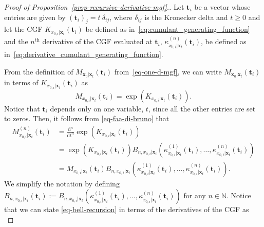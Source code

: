 \begin{proof}[Proof of Proposition~\ref{prop-recursive-derivative-mgf}.]
Let $\mathbf{t}_{i}$ be a vector whose entries are given by $(\mathbf{t}_{i})_{j} = t \: \delta_{ij}$, where $\delta_{ij}$ is the Kronecker delta and $t\geq 0$ and let the CGF $K_{x_{0,i} \vert \mathbf{x}_t}(\mathbf{t}_{i})$ be defined as in~\eqref{eq:cumulant_generating_function} and the $n^{\text{th}}$ derivative of the CGF evaluated at $\mathbf{t}_{i}$, $\kappa^{(n)}_{x_{0,i} \vert \mathbf{x}_t}(\mathbf{t}_{i})$, be defined as in~\eqref{eq:derivative_cumulant_generating_function}.

From the definition of $M_{\mathbf{x}_{0}\vert\mathbf{x}_{t}} (\mathbf{t}_i)$ from~\eqref{eq-one-d-mgf}, we can write $M_{\mathbf{x}_{0}\vert\mathbf{x}_{t}} (\mathbf{t}_i)$  in terms of $K_{x_{0,i} \vert \mathbf{x}_t}(\mathbf{t}_i)$ as 
\begin{equation}
    M_{{x}_{0,i}\vert\mathbf{x}_{t}} (\mathbf{t}_i) = \exp(K_{x_{0,i} \vert \mathbf{x}_t}(\mathbf{t}_i)).
\end{equation}
Notice that $\mathbf{t}_i$ depends only on one variable, ${t}$, since all the other entries are set to zeros. Then, it follows from \eqref{eq-faa-di-bruno} that
\begin{equation}
\label{eq-application-faa}
\begin{aligned}
M^{(n)}_{{x}_{0,i}\vert\mathbf{x}_{t}} (\mathbf{t}_i) &= \frac{\mathrm{d}^{n}}{\mathrm{d}t^{n}} \exp(K_{x_{0,i} \vert \mathbf{x}_t}(\mathbf{t}_i))\\ 
&= \exp(K_{x_{0,i} \vert \mathbf{x}_t}(\mathbf{t}_i))B_{n,x_{0,i} \vert \mathbf{x}_t}\left(\kappa^{(1)}_{x_{0,i} \vert \mathbf{x}_t}(\mathbf{t}_{i}), \dots,\kappa^{(n)}_{x_{0,i} \vert \mathbf{x}_t}(\mathbf{t}_{i})\right)  \\
&= M_{{x}_{0,i}\vert\mathbf{x}_{t}}(\mathbf{t}_i) B_{n,x_{0,i} \vert \mathbf{x}_t}\left(\kappa^{(1)}_{x_{0,i} \vert \mathbf{x}_t}(\mathbf{t}_{i}), \dots,\kappa^{(n)}_{x_{0,i} \vert \mathbf{x}_t}(\mathbf{t}_{i})\right).
\end{aligned}
\end{equation}
We simplify the notation by defining $B_{n,x_{0,i} \vert \mathbf{x}_t}(\mathbf{t}_i) := B_{n,x_{0,i} \vert \mathbf{x}_t}\left(\kappa^{(1)}_{x_{0,i} \vert \mathbf{x}_t}(\mathbf{t}_i), \dots,\kappa^{(n)}_{x_{0,i} \vert \mathbf{x}_t}(\mathbf{t}_i)\right)$ for any $n\in\mathbb{N}$.
Notice that we can state \eqref{eq-bell-recursion} in terms of the derivatives of the CGF as 
\begin{equation}

\end{equation}
\end{proof}
